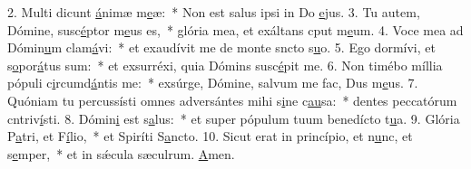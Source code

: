 2. Multi dicunt \uline{á}nimæ m\uline{e}æ:~* Non est salus ipsi in Do \uline{e}jus.
3. Tu autem, Dómine, susc\uline{é}ptor m\uline{e}us es,~* glória mea, et exáltans cput m\uline{e}um.
4. Voce mea ad Dómin\uline{u}m clam\uline{á}vi:~* et exaudívit me de monte sncto s\uline{u}o.
5. Ego dormívi, et s\uline{o}por\uline{á}tus sum:~* et exsurréxi, quia Dómins susc\uline{é}pit me.
6. Non timébo míllia pópuli c\uline{i}rcumd\uline{á}ntis me:~* exsúrge, Dómine, salvum me fac, Dus m\uline{e}us.
7. Quóniam tu percussísti omnes adversántes mihi s\uline{i}ne c\uline{au}sa:~* dentes peccatórum cntriv\uline{í}sti.
8. Dómin\uline{i} est s\uline{a}lus:~* et super pópulum tuum benedícto t\uline{u}a.
9. Glória P\uline{a}tri, et F\uline{í}lio,~* et Spiríti S\uline{a}ncto.
10. Sicut erat in princípio, et n\uline{u}nc, et s\uline{e}mper,~* et in sǽcula sæculrum. \uline{A}men.
